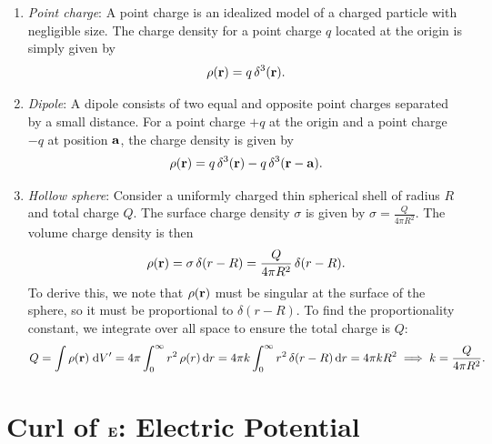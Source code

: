 \begin{enumerate}[label=\arabic*.]
    \item \textit{Point charge}: A point charge is an idealized model of a charged particle with negligible size. The charge density for a point charge $q$ located at the origin is simply given by
    \begin{align}
        \rho(\mathbf{r}) = q \, \delta^{3}(\mathbf{r}).
    \end{align}

    \item \textit{Dipole}: A dipole consists of two equal and opposite point charges separated by a small distance. For a point charge $+q$ at the origin and a point charge $-q$ at position $\mathbf{a}$, the charge density is given by
    \begin{align}
        \rho(\mathbf{r}) = q \, \delta^{3}(\mathbf{r}) - q \, \delta^{3}(\mathbf{r} - \mathbf{a}).
    \end{align}

    \item \textit{Hollow sphere}: Consider a uniformly charged thin spherical shell of radius $R$ and total charge $Q$. The surface charge density $\sigma$ is given by $\sigma = \frac{Q}{4 \pi R^{2}}$. The volume charge density is then
    \begin{align}
        \rho(\mathbf{r}) = \sigma \, \delta(r - R) = \frac{Q}{4 \pi R^{2}} \, \delta(r - R).
    \end{align}
    To derive this, we note that $\rho(\mathbf{r})$ must be singular at the surface of the sphere, so it must be proportional to $\delta(r - R)$. To find the proportionality constant, we integrate over all space to ensure the total charge is $Q$:
    \begin{align}
        Q = \int \rho(\mathbf{r}) \; \mathrm{d}V' = 4 \pi \int_{0}^{\infty} r^{2} \, \rho(r) \, \mathrm{d}r = 4 \pi k \int_{0}^{\infty} r^{2} \, \delta(r - R) \, \mathrm{d}r = 4 \pi k R^{2} \implies k = \frac{Q}{4 \pi R^{2}}. 
    \end{align}
\end{enumerate}

\section{Curl of $\mathbf{E}$: Electric Potential}

